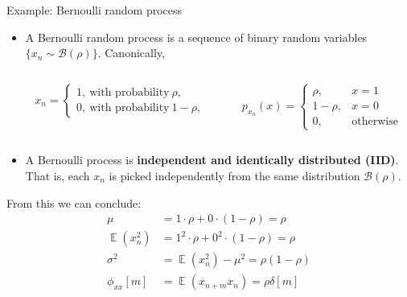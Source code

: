 \documentclass[10pt, handout]{beamer}
\DeclareMathOperator{\E}{\mathbb{E}} %
\begin{document}
\begin{frame}{Example: Bernoulli random process}
	
	\begin{itemize}
		\item A Bernoulli random process is a sequence of binary random variables $\{x_n \sim \mathcal{B}(\rho)\}$. Canonically, 
		\begin{columns}
			\begin{column}{0.5\linewidth}
				\begin{equation*}
				x_n = \begin{cases}
				1,~\text{with probability}~\rho, \\
				0,~\text{with probability}~1-\rho,
				\end{cases}
				\end{equation*}
			\end{column}
			\begin{column}{0.5\linewidth}
				\begin{equation*}
				p_{x_n}(x) = \begin{cases}
				\rho, &x = 1 \\
				1-\rho, &x = 0 \\
				0, &\text{otherwise}
				\end{cases}
				\end{equation*}
			\end{column}
		\end{columns}
		\item A Bernoulli process is \textbf{independent and identically distributed (IID)}. That is, each $x_n$ is picked independently from the same distribution $\mathcal{B}(\rho)$.
	\end{itemize}
	From this we can conclude:
	\begin{align*} 
	\mu &= 1\cdot\rho + 0\cdot(1-\rho) = \rho \\
	\E(x_n^2) &= 1^2\cdot\rho + 0^2\cdot(1-\rho) = \rho \\
	\sigma^2 &= \E(x_n^2) - \mu^2 = \rho(1 - \rho) \\
	\phi_{xx}[m] &=\E(x_{n+m}x_n) = \rho\delta[m] \tag{since it is IID}
	\end{align*}
	
\end{frame}
\end{document}
